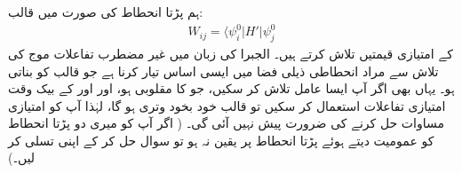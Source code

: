 ہم  پڑتا انحطاط کی صورت میں  قالب:
\begin{align}
W_{i j} = \langle \psi_i^0 | H' | \psi_j^0
\end{align}
کے امتیازی قیمتیں تلاش کرتے ہیں۔ الجبرا کی زبان میں  غیر مضطرب تفاعلات موج کی تلاش سے مراد انحطاطی ذيلی فضا میں ایسی اساس تیار کرنا ہے جو قالب  کو  بناتی ہو۔ یہاں بھی اگر آپ ایسا عامل  تلاش کر سکیں، جو  کا مقلوبی ہو، اور  اور  کے بیک وقت امتیازی تفاعلات استعمال کر سکیں تو قالب  خود بخود وتری ہو گا، لہٰذا آپ کو امتیازی مساوات حل کرنے کی ضرورت پیش نہیں آئی گی۔ ( اگر آپ کو میری دو پڑتا انحطاط کو عمومیت دیتے ہوئے  پڑتا انحطاط پر یقین نہ ہو تو سوال  حل کر کے اپنی تسلی کر لیں۔)

